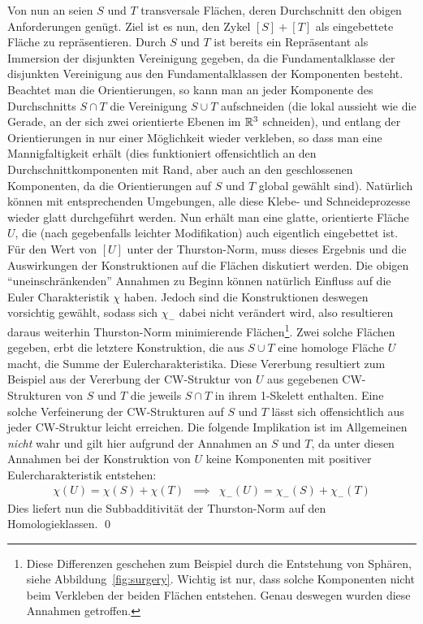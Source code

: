             Von nun an seien $S$ und $T$ transversale Flächen, deren Durchschnitt den obigen Anforderungen genügt. Ziel ist es nun, den Zykel $[S]+[T]$ als eingebettete Fläche zu repräsentieren. Durch $S$ und $T$ ist bereits ein Repräsentant als Immersion der disjunkten Vereinigung gegeben, da die Fundamentalklasse der disjunkten Vereinigung aus den Fundamentalklassen der Komponenten besteht. Beachtet man die Orientierungen, so kann man an jeder Komponente des Durchschnitts $S\cap T$ die Vereinigung $S\cup T$ aufschneiden (die lokal aussieht wie die Gerade, an der sich zwei orientierte Ebenen im $\mathbb{R}^3$ schneiden), und entlang der Orientierungen in nur einer Möglichkeit wieder verkleben, so dass man eine Mannigfaltigkeit erhält (dies funktioniert offensichtlich an den Durchschnittkomponenten mit Rand, aber auch an den geschlossenen Komponenten, da die Orientierungen auf $S$ und $T$ global gewählt sind). Natürlich können mit entsprechenden Umgebungen, alle diese Klebe- und Schneideprozesse wieder glatt durchgeführt werden. Nun erhält man eine glatte, orientierte Fläche $U$, die (nach gegebenfalls leichter Modifikation) auch eigentlich eingebettet ist. Für den Wert von $[U]$ unter der Thurston-Norm, muss dieses Ergebnis und die Auswirkungen der Konstruktionen auf die Flächen diskutiert werden. Die obigen "`uneinschränkenden"' Annahmen zu Beginn können natürlich Einfluss auf die Euler Charakteristik $\chi$ haben. Jedoch sind die Konstruktionen deswegen vorsichtig gewählt, sodass sich $\chi_-$ dabei nicht verändert wird, also resultieren daraus weiterhin Thurston-Norm minimierende Flächen\footnote{Diese Differenzen geschehen zum Beispiel durch die Entstehung von Sphären, siehe Abbildung~\ref{fig:surgery}. Wichtig ist nur, dass solche Komponenten nicht beim Verkleben der beiden Flächen entstehen. Genau deswegen wurden diese Annahmen getroffen.}. Zwei {solche} Flächen gegeben, erbt die letztere Konstruktion, die aus $S\cup T$ eine homologe Fläche $U$ macht, die Summe der Eulercharakteristika. Diese Vererbung resultiert zum Beispiel aus der Vererbung der CW-Struktur von $U$ aus gegebenen CW-Strukturen von $S$ und $T$ die jeweils $S\cap T$ in ihrem 1-Skelett enthalten. Eine solche Verfeinerung der CW-Strukturen auf $S$ und $T$ lässt sich offensichtlich aus jeder CW-Struktur leicht erreichen. Die folgende Implikation ist im Allgemeinen \emph{nicht} wahr und gilt hier aufgrund der Annahmen an $S$ und $T$, da unter diesen Annahmen bei der Konstruktion von $U$ keine Komponenten mit positiver Eulercharakteristik entstehen:
            \begin{eqnarray*}
                \chi(U) = \chi(S) + \chi(T) &\implies& \chi_-(U)=\chi_-(S) + \chi_-(T)
            \end{eqnarray*}
            Dies liefert nun die Subbadditivität der Thurston-Norm auf den Homologieklassen.
        \qed
        \vspace{6pt}

